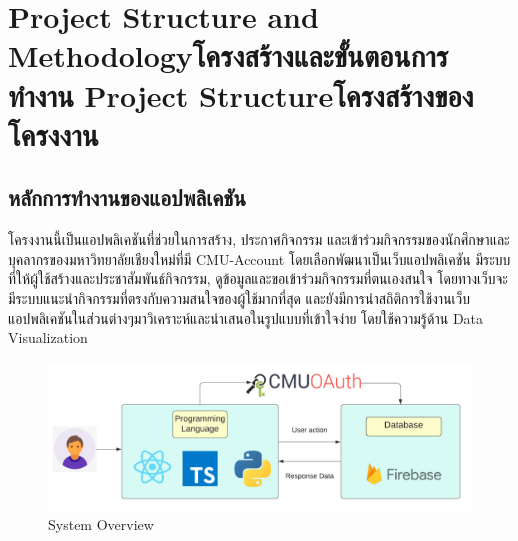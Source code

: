 \chapter{\ifproject%
\ifenglish Project Structure and Methodology\else โครงสร้างและขั้นตอนการทำงาน\fi
\else%
\ifenglish Project Structure\else โครงสร้างของโครงงาน\fi
\fi
}


\makeatletter


\makeatother



\section{หลักการทำงานของแอปพลิเคชัน}
โครงงานนี้เป็นแอปพลิเคชันที่ช่วยในการสร้าง, ประกาศกิจกรรม และเข้าร่วมกิจกรรมของนักศึกษาและบุคลากรของมหาวิทยาลัยเชียงใหม่ที่มี CMU-Account
โดยเลือกพัฒนาเป็นเว็บแอปพลิเคชัน มีระบบที่ให้ผู้ใช้สร้างและประชาสัมพันธ์กิจกรรม, ดูข้อมูลและขอเข้าร่วมกิจกรรมที่ตนเองสนใจ โดยทางเว็บจะมีระบบแนะนำกิจกรรมที่ตรงกับความสนใจของผู้ใช้มากที่สุด และยังมีการนำสถิติการใช้งานเว็บแอปพลิเคชันในส่วนต่างๆมาวิเคราะห์และนำเสนอในรูปแบบที่เข้าใจง่าย โดยใช้ความรู้ด้าน Data Visualization
\begin{figure}[h] %
\begin{center}
\includegraphics[width=0.9\linewidth]{image/31_system_overview.png}
\end{center}
\caption[Poem]{System Overview}
\label{fig:system_overview}
\end{figure}
